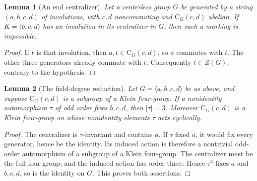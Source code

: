 \documentclass[11pt,a4paper]{article}
\newtheorem{lemma}{Lemma}
\newcommand{\gen}[1]{\langle #1\rangle}
\newcommand{\Cent}{\mathrm C}
\begin{document}
\begin{lemma}[An end centralizer]\label{end}
Let a centerless group $G$ be generated by a string $(a,b,c,d)$ of
involutions, with $c,d$ noncommuting and $\Cent_G(c,d)$ abelian.
If $K=\gen{b,c,d}$ has an involution in its centralizer in $G$, then
such a marking is impossible.
\end{lemma}
\begin{proof}
If $t$ is that involution, then $a,t\in\Cent_G(c,d)$, so $a$ commutes
with $t$. The other three generators already commute with $t$.
Consequently $t\in Z(G)$, contrary to the hypothesis.
\end{proof}

\begin{lemma}[The field-degree reduction]\label{degree}
Let $G=\gen{a,b,c,d}$ be as above, and suppose
$\Cent_G(c,d)$ is a subgroup of a Klein four-group. If a nonidentity
automorphism $\tau$ of odd order fixes $b,c,d$, then $|\tau|=3$.
Moreover $\Cent_G(c,d)$ is a Klein four-group on whose nonidentity
elements $\tau$ acts cyclically.
\end{lemma}
\begin{proof}
The centralizer is $\tau$-invariant and contains $a$. If $\tau$ fixed
$a$, it would fix every generator, hence be the identity. Its induced
action is therefore a nontrivial odd-order automorphism of a subgroup
of a Klein four-group. The centralizer must be the full four-group,
and the induced action has order three. Hence $\tau^3$ fixes $a$ and
$b,c,d$, so is the identity on $G$. This proves both assertions.
\end{proof}
\end{document}
